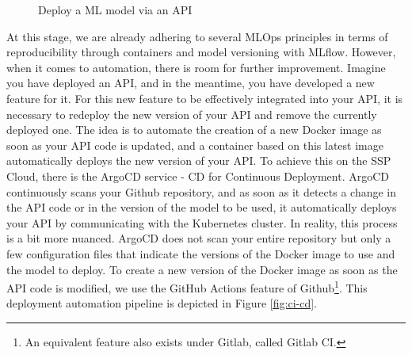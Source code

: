 \begin{figure}[htbp]
    \centering
    \caption{Deploy a ML model via an API}
    \label{fig:api-datalab}
\end{figure}


At this stage, we are already adhering to several MLOps principles in terms of reproducibility through containers and model versioning with MLflow. However, when it comes to automation, there is room for further improvement. Imagine you have deployed an API, and in the meantime, you have developed a new feature for it. For this new feature to be effectively integrated into your API, it is necessary to redeploy the new version of your API and remove the currently deployed one. The idea is to automate the creation of a new Docker image as soon as your API code is updated, and a container based on this latest image automatically deploys the new version of your API. To achieve this on the SSP Cloud, there is the ArgoCD service - CD for Continuous Deployment. ArgoCD continuously scans your Github repository, and as soon as it detects a change in the API code or in the version of the model to be used, it automatically deploys your API by communicating with the Kubernetes cluster. In reality, this process is a bit more nuanced. ArgoCD does not scan your entire repository but only a few configuration files that indicate the versions of the Docker image to use and the model to deploy. To create a new version of the Docker image as soon as the API code is modified, we use the GitHub Actions feature of Github\footnote{An equivalent feature also exists under Gitlab, called Gitlab CI.}. This deployment automation pipeline is depicted in Figure \ref{fig:ci-cd}.

